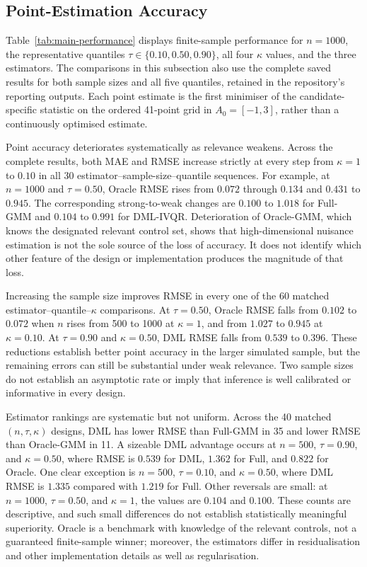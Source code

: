 \subsection{Point-Estimation Accuracy}
\label{sec:results-point-accuracy}

Table~\ref{tab:main-performance} displays finite-sample performance for $n=1000$, the representative quantiles $\tau\in\{0.10,0.50,0.90\}$, all four $\kappa$ values, and the three estimators. The comparisons in this subsection also use the complete saved results for both sample sizes and all five quantiles, retained in the repository's reporting outputs. Each point estimate is the first minimiser of the candidate-specific statistic on the ordered 41-point grid in $A_0=[-1,3]$, rather than a continuously optimised estimate.



Point accuracy deteriorates systematically as relevance weakens. Across the complete results, both MAE and RMSE increase strictly at every step from $\kappa=1$ to $0.10$ in all 30 estimator--sample-size--quantile sequences. For example, at $n=1000$ and $\tau=0.50$, Oracle RMSE rises from $0.072$ through $0.134$ and $0.431$ to $0.945$. The corresponding strong-to-weak changes are $0.100$ to $1.018$ for Full-GMM and $0.104$ to $0.991$ for DML-IVQR. Deterioration of Oracle-GMM, which knows the designated relevant control set, shows that high-dimensional nuisance estimation is not the sole source of the loss of accuracy. It does not identify which other feature of the design or implementation produces the magnitude of that loss.

Increasing the sample size improves RMSE in every one of the 60 matched estimator--quantile--$\kappa$ comparisons. At $\tau=0.50$, Oracle RMSE falls from $0.102$ to $0.072$ when $n$ rises from 500 to 1000 at $\kappa=1$, and from $1.027$ to $0.945$ at $\kappa=0.10$. At $\tau=0.90$ and $\kappa=0.50$, DML RMSE falls from $0.539$ to $0.396$. These reductions establish better point accuracy in the larger simulated sample, but the remaining errors can still be substantial under weak relevance. Two sample sizes do not establish an asymptotic rate or imply that inference is well calibrated or informative in every design.

Estimator rankings are systematic but not uniform. Across the 40 matched $(n,\tau,\kappa)$ designs, DML has lower RMSE than Full-GMM in 35 and lower RMSE than Oracle-GMM in 11. A sizeable DML advantage occurs at $n=500$, $\tau=0.90$, and $\kappa=0.50$, where RMSE is $0.539$ for DML, $1.362$ for Full, and $0.822$ for Oracle. One clear exception is $n=500$, $\tau=0.10$, and $\kappa=0.50$, where DML RMSE is $1.335$ compared with $1.219$ for Full. Other reversals are small: at $n=1000$, $\tau=0.50$, and $\kappa=1$, the values are $0.104$ and $0.100$. These counts are descriptive, and such small differences do not establish statistically meaningful superiority. Oracle is a benchmark with knowledge of the relevant controls, not a guaranteed finite-sample winner; moreover, the estimators differ in residualisation and other implementation details as well as regularisation.

